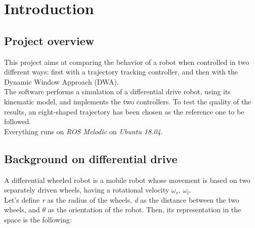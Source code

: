 \documentclass[11pt,a4paper]{article}
\begin{document}


\newpage

\renewcommand*\contentsname{Table of Contents}
\tableofcontents

\newpage





\section{Introduction}


\subsection{Project overview}

This project aims at comparing the behavior of a robot when controlled in two different ways: first with a
trajectory tracking controller, and then with the Dynamic Window Approach (DWA).\\

The software performs a simulation of a differential drive robot, using its kinematic model, and implements
the two controllers. To test the quality of the results, an eight-shaped trajectory has been chosen as the
reference one to be followed.\\

Everything runs on \textit{ROS Melodic} on \textit{Ubuntu 18.04}.


\subsection{Background on differential drive}


A differential wheeled robot is a mobile robot whose movement is based on two separately driven wheels,
having a rotational velocity $\omega_r$, $\omega_l$. \\

Let's define \textit{r} as the radius of the wheels, \textit{d} as the distance between the two wheels,
and $\theta$ as the orientation of the robot. Then, its representation in the space is the following:
\end{document}
